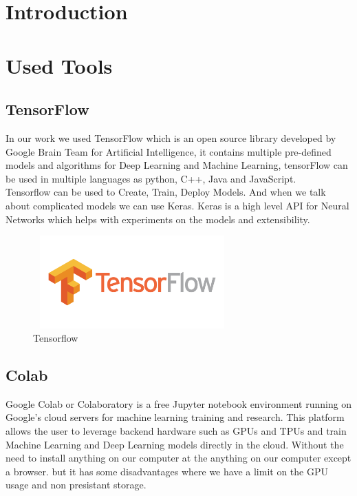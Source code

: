 \section{Introduction}
\vspace{0.2in}
\hspace*{0.16in}

\section{Used Tools}



\subsection{TensorFlow}
In our work we used TensorFlow which is an open source library developed by Google Brain Team for Artificial Intelligence, it contains multiple pre-defined models and algorithms for Deep Learning and Machine Learning, tensorFlow can be used in multiple languages as python, C++, Java and JavaScript.\\
Tensorflow can be used to Create, Train, Deploy Models. And when we talk about complicated models we can use Keras.
Keras is a high level API for Neural Networks which helps with experiments on the models and extensibility.

\begin{figure}[H]
    \centering
      \vspace{-0.1in}
        \centerline{\includegraphics[width = 3in, height = 1.4in]{../images/tensorflow.png}}
        \caption{Tensorflow}
        \label{Tensorflow}
    \end{figure}

\subsection{Colab}
Google Colab or Colaboratory is a free Jupyter notebook environment running on Google's cloud servers for machine learning training and research. This platform allows the user to leverage backend hardware such as GPUs and TPUs and train Machine Learning and Deep Learning models directly in the cloud. Without the need to install anything on our computer at the anything on our computer except a browser.
but it has some disadvantages where we have a limit on the GPU usage
and non presistant storage.

